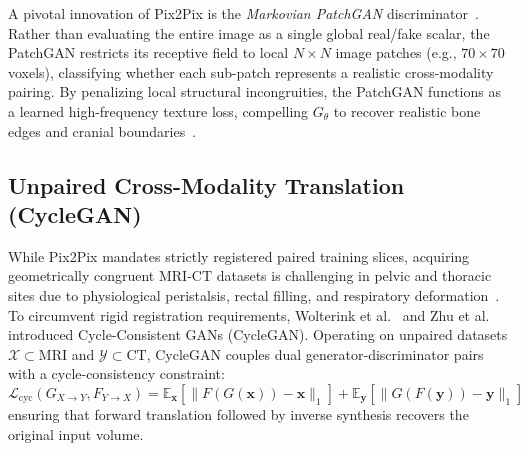 A pivotal innovation of Pix2Pix is the \emph{Markovian PatchGAN} discriminator~\cite{isola2017image}. Rather than evaluating the entire image as a single global real/fake scalar, the PatchGAN restricts its receptive field to local $N \times N$ image patches (e.g., $70 \times 70$ voxels), classifying whether each sub-patch represents a realistic cross-modality pairing. By penalizing local structural incongruities, the PatchGAN functions as a learned high-frequency texture loss, compelling $G_\theta$ to recover realistic bone edges and cranial boundaries~\cite{nie2017medical,maspero2018dose,yang2020synthetic}.

\subsection{Unpaired Cross-Modality Translation (CycleGAN)}
While Pix2Pix mandates strictly registered paired training slices, acquiring geometrically congruent MRI-CT datasets is challenging in pelvic and thoracic sites due to physiological peristalsis, rectal filling, and respiratory deformation~\cite{wolterink2017deep}. To circumvent rigid registration requirements, Wolterink et al.~\cite{wolterink2017deep} and Zhu et al.~\cite{zhu2017unpaired} introduced Cycle-Consistent GANs (CycleGAN). Operating on unpaired datasets $\mathcal{X} \subset \text{MRI}$ and $\mathcal{Y} \subset \text{CT}$, CycleGAN couples dual generator-discriminator pairs with a cycle-consistency constraint:
\begin{equation}
\mathcal{L}_{\text{cyc}}(G_{X \to Y}, F_{Y \to X}) = \mathbb{E}_{\mathbf{x}} \left[ \|F(G(\mathbf{x})) - \mathbf{x}\|_1 \right] + \mathbb{E}_{\mathbf{y}} \left[ \|G(F(\mathbf{y})) - \mathbf{y}\|_1 \right]
\label{eq:cycle_consistency}
\end{equation}
ensuring that forward translation followed by inverse synthesis recovers the original input volume.

